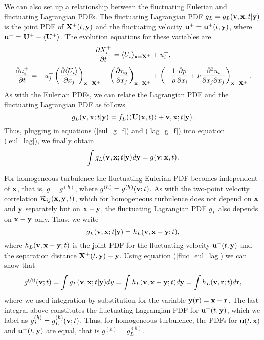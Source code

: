\documentclass[oneside,a4paper,11pt]{report}
\begin{document}
We can also set up a relationship between the fluctuating Eulerian and fluctuating Lagrangian PDFs. The fluctuating Lagrangian PDF $g_L = g_L(\mathbf{v}, \mathbf{x}; t|\mathbf{y})$ is the joint PDF of $\bold{X}^+(t,\mathbf{y})$ and the fluctuating velocity $\mathbf{u}^+ = \mathbf{u}^+(t,\mathbf{y})$, where $\mathbf{u}^+ = \mathbf{U}^+ - \langle  \mathbf{U}^+ \rangle$. The evolution equations for these variables are
\begin{equation}
\frac{\partial X_i^+}{\partial t} = \langle U_i \rangle_{\mathbf{x} = \mathbf{X}^+} + u_i^+ ,
\end{equation}
\begin{equation}
\frac{\partial u_i^+}{\partial t} = -u_j^+ \left ( \frac{\partial \langle U_i \rangle}{\partial x_j} \right)_{\mathbf{x} = \mathbf{X}^+} + \left ( \frac{\partial \tau_{ij}}{\partial x_j} \right )_{\mathbf{x} = \mathbf{X}^+} + \left ( - \frac{1}{\rho} \frac{\partial p}{\partial x_i} + \nu \frac{\partial^2 u_i}{\partial x_j \partial x_j} \right)_{\mathbf{x} = \mathbf{X}^+}.
\end{equation}
As with the Eulerian PDFs, we can relate the Lagrangian PDF and the fluctuating Lagrangian PDF as follows
\begin{equation}
\label{lag_g_f}
g_L(\mathbf{v},\mathbf{x}; t|\mathbf{y}) = f_L(\langle \mathbf{U}(\mathbf{x},t) \rangle + \mathbf{v}, \mathbf{x}; t|\mathbf{y}).
\end{equation}
Thus, plugging in equations (\ref{eul_g_f}) and (\ref{lag_g_f}) into equation (\ref{eul_lag}), we finally obtain
\begin{equation}
\label{fluc_eul_lag}
\int g_L(\mathbf{v},\mathbf{x}; t|\mathbf{y}) d\mathbf{y} = g(\mathbf{v}; \mathbf{x},t).
\end{equation}

For homogeneous turbulence the fluctuating Eulerian PDF becomes independent of $\mathbf{x}$, that is, $g = g^{(h)}$, where $g^{(h)} = g^{(h)}(\mathbf{v};t)$. As with the two-point velocity correlation $\mathcal{R}_{ij}(\mathbf{x},\mathbf{y},t)$, which for homogeneous turbulence does not depend on $\mathbf{x}$ and $\mathbf{y}$ separately but on $\mathbf{x} - \mathbf{y}$, the fluctuating Lagrangian PDF $g_L$  also depends on $\mathbf{x} - \mathbf{y}$ only. Thus, we write
\begin{equation}
g_L(\mathbf{v} ,\mathbf{x} ; t |\mathbf{y}) = h_L(\mathbf{v}, \mathbf{x} - \mathbf{y}; t),
\end{equation}
where $h_L(\mathbf{v}, \mathbf{x} - \mathbf{y}; t)$ is the joint PDF for the fluctuating velocity $\mathbf{u}^+(t,\mathbf{y})$ and the separation distance $\mathbf{X}^+(t,\mathbf{y}) - \mathbf{y}$. Using equation (\ref{fluc_eul_lag}) we can show that
\begin{equation}
g^{(h)}(\mathbf{v};t) =  \int g_L(\mathbf{v},\mathbf{x};t|\mathbf{y})dy = \int h_L(\mathbf{v}, \mathbf{x} - \mathbf{y}; t) d\mathbf{y} = \int h_L(\mathbf{v}, \mathbf{r};t) d\mathbf{r},
\end{equation}
where we used integration by substitution for the variable $\mathbf{y}(\mathbf{r}) = \mathbf{x} - \mathbf{r}$. The last integral above constitutes the fluctuating Lagrangian PDF for $\mathbf{u}^+(t,\mathbf{y})$, which we label as $g_L^{(h)} = g_L^{(h)}(\mathbf{v}; t)$. Thus, for homogeneous turbulence, the PDFs for $\mathbf{u}(t,\mathbf{x})$ and $\mathbf{u}^+(t,\mathbf{y})$ are equal, that is $g^{(h)} = g_L^{(h)}$.
\end{document}
